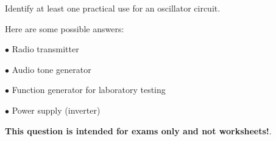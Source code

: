

Identify at least one practical use for an oscillator circuit.







Here are some possible answers:

\medskip
\goodbreak
\item{$\bullet$} Radio transmitter
\item{$\bullet$} Audio tone generator
\item{$\bullet$} Function generator for laboratory testing
\item{$\bullet$} Power supply (inverter)
\medskip







{\bf This question is intended for exams only and not worksheets!}.




